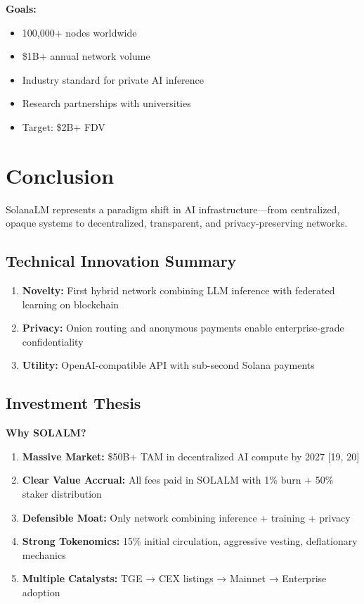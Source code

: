 \documentclass[11pt,a4paper]{article}
\begin{document}
\textbf{Goals:}
\begin{itemize}
    \item 100,000+ nodes worldwide
    \item \$1B+ annual network volume
    \item Industry standard for private AI inference
    \item Research partnerships with universities
    \item Target: \$2B+ FDV
\end{itemize}

\section{Conclusion}

SolanaLM represents a paradigm shift in AI infrastructure—from centralized, opaque systems to decentralized, transparent, and privacy-preserving networks.

\subsection{Technical Innovation Summary}

\begin{enumerate}
    \item \textbf{Novelty:} First hybrid network combining LLM inference with federated learning on blockchain
    \item \textbf{Privacy:} Onion routing and anonymous payments enable enterprise-grade confidentiality
    \item \textbf{Utility:} OpenAI-compatible API with sub-second Solana payments
\end{enumerate}

\subsection{Investment Thesis}

\textbf{Why SOLALM?}

\begin{enumerate}
    \item \textbf{Massive Market:} \$50B+ TAM in decentralized AI compute by 2027 [19, 20]
    \item \textbf{Clear Value Accrual:} All fees paid in SOLALM with 1\% burn + 50\% staker distribution
    \item \textbf{Defensible Moat:} Only network combining inference + training + privacy
    \item \textbf{Strong Tokenomics:} 15\% initial circulation, aggressive vesting, deflationary mechanics
    \item \textbf{Multiple Catalysts:} TGE → CEX listings → Mainnet → Enterprise adoption
\end{enumerate}
\end{document}
